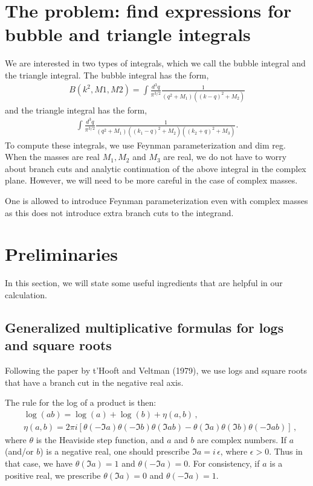 \documentclass[twoside]{article}
\begin{document}
\section{The problem: find expressions for bubble and triangle integrals}
We are interested in two types of integrals, which we call the bubble integral and the triangle integral. The bubble integral has the form,
\begin{align}
\label{eq:bubble}
B(k^2,M1,M2) =  \int \frac{d^3q}{\pi^{3/2}}\frac{1}{(q^2 + M_1)( (k-q)^2 + M_2)}
\end{align}
and the triangle integral has the form,
\begin{align}
  \int \frac{d^3q}{\pi^{3/2}}\frac{1}{(q^2 + M_1)( (k_1-q)^2 + M_2)( (k_2 + q)^2 + M_3)}.
\end{align}
To compute these integrals, we use Feynman parameterization and dim reg. When the masses are real $M_1,M_2$ and $M_3$ are real, we do not
have to worry about branch cuts and analytic continuation of the above integral in the complex plane. However, we will need to be more
careful in the case of complex masses. 

One is allowed to introduce Feynman parameterization even with complex masses as this does not introduce extra branch cuts to the integrand.

\section{Preliminaries}
\label{sec:prelim}

In this section, we will state some useful ingredients that are helpful in our calculation.

\subsection{Generalized multiplicative formulas for logs and square roots}

Following the paper by t'Hooft and Veltman (1979), we use logs and square roots that have a branch cut in the negative real axis.

The rule for the log of a product is then:
\begin{equation}
\begin{split}
& \log(a b) = \log(a) + \log(b) + \eta(a,b)\,, \\
& \eta(a,b) = 2 \pi i \left[ \theta(- \Im a) \theta(- \Im b) \theta(\Im ab) - \theta(\Im a) \theta(\Im b) \theta(-\Im ab) \right]\,,
\end{split}
\end{equation}
where $\theta$ is the Heaviside step function, and $a$ and $b$ are complex numbers. If $a$ (and/or $b$) is a negative real, one should prescribe $\Im a = i \, \epsilon$, where $\epsilon>0$. Thus in that case, we have $\theta(\Im a)=1$ and $\theta(-\Im a)=0$. For consistency, if $a$ is a positive real, we prescribe $\theta(\Im a)=0$ and $\theta(-\Im a)=1$.
\end{document}
